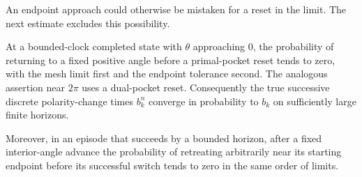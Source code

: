 An endpoint approach could otherwise be mistaken for a reset in the
limit.  The next estimate excludes this possibility.

\begin{lemma}
\label{loop:no-skip}
At a bounded-clock completed state with $\theta$ approaching $0$,
the probability of returning to a fixed positive angle before a
primal-pocket reset tends to zero, with the mesh limit first and the
endpoint tolerance second.  The analogous assertion near $2\pi$
uses a dual-pocket reset.  Consequently the true successive discrete
polarity-change times $b_k^n$ converge in probability to $b_k$ on
sufficiently large finite horizons.

Moreover, in an episode that succeeds by a bounded horizon, after a
fixed interior-angle advance the probability of retreating arbitrarily
near its starting endpoint before its successful switch tends to zero
in the same order of limits.
\end{lemma}

